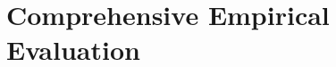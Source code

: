 \documentclass[format=acmsmall, review=false]{acmart}
\begin{document}




\newpage
\section{Comprehensive Empirical Evaluation}
\end{document}
